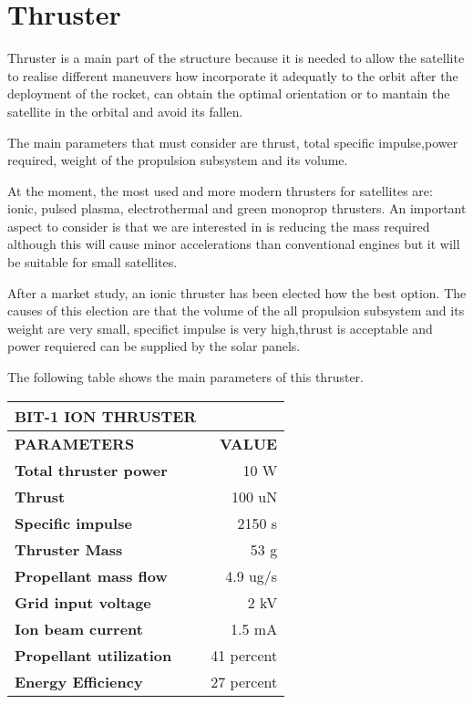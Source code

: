 \section{Thruster}
Thruster is a main part of the structure because it is needed to allow the satellite to realise different maneuvers how incorporate it adequatly to the orbit after the deployment of the rocket, can obtain the optimal orientation or to mantain the satellite in the orbital and avoid its fallen. 

The main parameters that must consider are thrust, total specific impulse,power required, weight of the  propulsion subsystem and its volume.

At the moment, the most used and more modern thrusters for satellites are: ionic, pulsed plasma, electrothermal and green monoprop thrusters. An important aspect to consider is that we are interested in is reducing the mass required although this will cause minor accelerations than conventional engines but it will be suitable for small satellites.

After a market study, an ionic thruster has been elected how the best option. The causes of this election are that the volume of the all propulsion subsystem and its weight are very small, specifict impulse is very high,thrust is acceptable and power requiered can be supplied by the solar panels.

The following table shows the main parameters of this thruster.

\begin{longtable}{| l | r |}

\hline
\rowcolor[gray]{0.60}	\textbf{BIT-1 ION THRUSTER} \\
\hline

\hline
\rowcolor[gray]{0.75}	\textbf{PARAMETERS} &  \textbf{VALUE}   \\
\hline

\cellcolor[gray]{0.85} \textbf{Total thruster power} & 10 W  \\
\cellcolor[gray]{0.85} \textbf{Thrust} & 100 uN \\
\cellcolor[gray]{0.85} \textbf{Specific impulse} & 2150 s \\
\cellcolor[gray]{0.85} \textbf{Thruster Mass} & 53 g \\
\cellcolor[gray]{0.85} \textbf{Propellant mass flow} & 4.9 ug/s \\
\cellcolor[gray]{0.85} \textbf{Grid input voltage} & 2 kV \\
\cellcolor[gray]{0.85} \textbf{Ion beam current} & 1.5 mA \\
\cellcolor[gray]{0.85} \textbf{Propellant utilization} & 41 percent \\
\cellcolor[gray]{0.85} \textbf{Energy Efficiency} & 27 percent \\
\hline

\end{longtable}